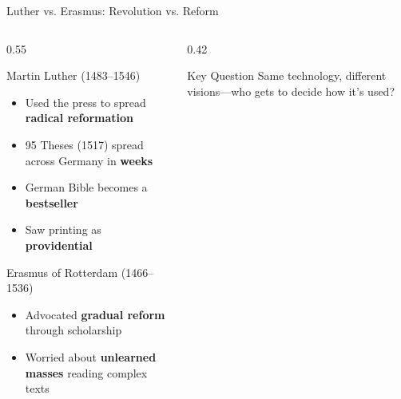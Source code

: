 \documentclass[aspectratio=169,11pt]{beamer}
\begin{document}
\begin{frame}{Luther vs. Erasmus: Revolution vs. Reform}
\begin{columns}
\begin{column}{0.55\textwidth}
\begin{block}{Martin Luther (1483--1546)}
\begin{itemize}
  \item Used the press to spread \textbf{radical reformation}
  \item 95 Theses (1517) spread across Germany in \textbf{weeks}
  \item German Bible becomes a \textbf{bestseller}
  \item Saw printing as \textbf{providential}
\end{itemize}
\end{block}

\begin{alertblock}{Erasmus of Rotterdam (1466--1536)}
\begin{itemize}
  \item Advocated \textbf{gradual reform} through scholarship
  \item Worried about \textbf{unlearned masses} reading complex texts
\end{itemize}
\end{alertblock}
\end{column}

\begin{column}{0.42\textwidth}

\vspace{0.5em}
\begin{exampleblock}{Key Question}
Same technology, different visions---who gets to decide how it's used?
\end{exampleblock}
\end{column}
\end{columns}
\end{frame}
\end{document}
